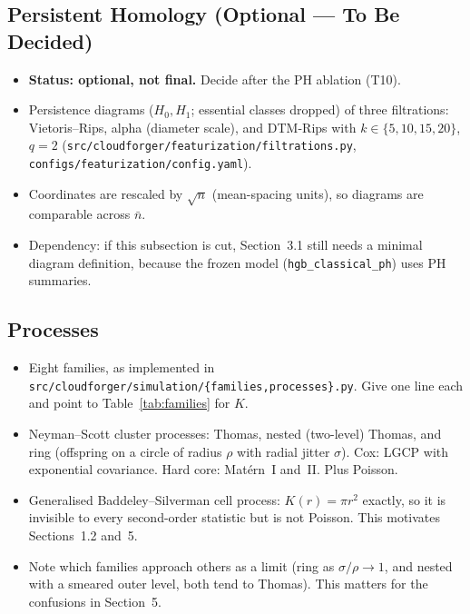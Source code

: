 \documentclass[twoside]{article}
\newcommand{\src}[1]{{\footnotesize\texttt{#1}}}
\newcommand{\nb}{\bar n}
\begin{document}
\subsection{Persistent Homology (Optional --- To Be Decided)}
\begin{itemize}
  \item \textbf{Status: optional, not final.} Decide after the PH ablation (T10).
  \item Persistence diagrams ($H_0,H_1$; essential classes dropped) of three filtrations: Vietoris--Rips, alpha
        (diameter scale), and DTM-Rips with $k\in\{5,10,15,20\}$, $q=2$
        (\src{src/cloudforger/featurization/filtrations.py}, \src{configs/featurization/config.yaml}).
  \item Coordinates are rescaled by $\sqrt n$ (mean-spacing units), so diagrams are comparable across $\nb$.
  \item Dependency: if this subsection is cut, Section~3.1 still needs a minimal diagram definition, because the
        frozen model (\texttt{hgb\_classical\_ph}) uses PH summaries.
\end{itemize}

\subsection{Processes}
\begin{itemize}
  \item Eight families, as implemented in \src{src/cloudforger/simulation/\{families,processes\}.py}. Give one line
        each and point to Table~\ref{tab:families} for $K$.
  \item Neyman--Scott cluster processes: Thomas, nested (two-level) Thomas, and ring (offspring on a circle of
        radius $\rho$ with radial jitter $\sigma$). Cox: LGCP with exponential covariance. Hard core:
        Mat\'ern~I and~II. Plus Poisson.
  \item Generalised Baddeley--Silverman cell process: $K(r)=\pi r^2$ exactly, so it is invisible to every
        second-order statistic but is not Poisson. This motivates Sections~1.2 and~5.
  \item Note which families approach others as a limit (ring as $\sigma/\rho\to1$, and nested with a smeared outer
        level, both tend to Thomas). This matters for the confusions in Section~5.
\end{itemize}
\end{document}
